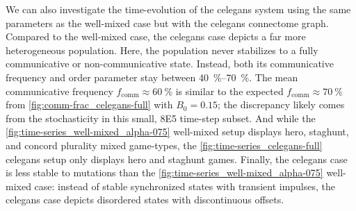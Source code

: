 \documentclass[pdflatex,twocolumn,sn-nature,super]{sn-jnl}
\begin{document}
We can also investigate the time-evolution of the \gls{celegans} system
using the same parameters as the
well-mixed case but with the \gls{celegans} connectome graph.
Compared to the well-mixed case,
the  \gls{celegans} case
depicts a far more heterogeneous population.
Here, the population never stabilizes
to a fully communicative or non-communicative state.
Instead, both its communicative frequency and order parameter
stay between \SIrange{40}{70}{\percent}.
The mean communicative frequency $f_{\text{comm}} \approx \SI{60}{\percent}$
is similar to the expected $f_{\text{comm}} \approx \SI{70}{\percent}$
from \cref{fig:comm-frac_celegans-full} with $B_0 = 0.15$;
the discrepancy likely comes from the stochasticity
in this small, \num{8E5} time-step subset.
And while the \cref{fig:time-series_well-mixed_alpha-075} well-mixed setup
displays hero, staghunt, and concord plurality mixed game-types,
the \cref{fig:time-series_celegans-full} \gls{celegans} setup
only displays hero and staghunt games.
Finally, the \gls{celegans} case is less stable to mutations
than the \cref{fig:time-series_well-mixed_alpha-075} well-mixed case:
instead of stable synchronized states with transient impulses,
the \gls{celegans} case depicts disordered states with discontinuous offsets.
\end{document}
